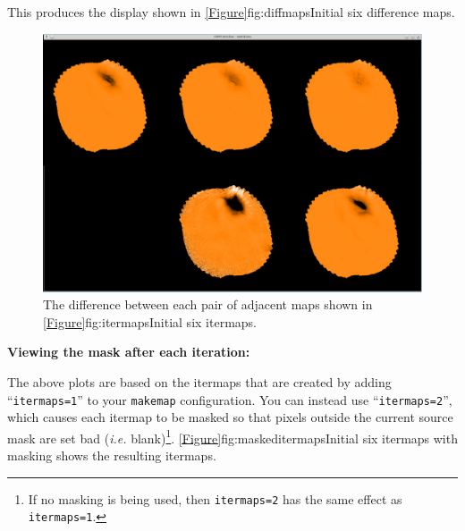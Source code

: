 \begin{terminalv}
\begin{terminalv}
%
\end{terminalv}

This produces the display shown in \cref{Figure}{fig:diffmaps}{Initial
six difference maps}.

\begin{figure}
\begin{center}
  \includegraphics[width=\linewidth]{sc21_diffmaps}
\end{center}
\caption[Initial six difference maps]{\small The difference between each
pair of adjacent maps shown in \cref{Figure}{fig:itermaps}{Initial
six itermaps}.}
\label{fig:diffmaps}
\end{figure}

\textbf{Viewing the mask after each iteration:}

The above plots are based on the itermaps that are created by adding
``\texttt{itermaps=1}'' to your \texttt{makemap} configuration. You can
instead use ``\texttt{itermaps=2}'', which causes each itermap to be
masked so that pixels outside the current source mask are set bad
(\emph{i.e.} blank)\footnote{If no masking is being used, then
\texttt{itermaps=2} has the same effect as \texttt{itermaps=1}.}.
\cref{Figure}{fig:maskeditermaps}{Initial six itermaps with masking}
shows the resulting itermaps.


\end{terminalv}
